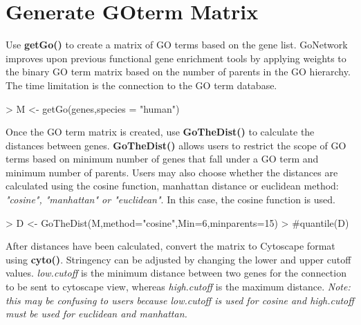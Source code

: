 \documentclass{article}
\begin{document}
\section*{Generate GOterm Matrix}
Use \textbf{getGo()} to create a matrix of GO terms based on the gene list.  GoNetwork improves upon previous functional gene enrichment tools by applying weights to the binary GO term matrix based on the number of parents in the GO hierarchy. The time limitation is the connection to the GO term database.
\begin{Schunk}
\begin{Sinput}
> M <- getGo(genes,species = "human")
\end{Sinput}
\end{Schunk}


Once the GO term matrix is created, use \textbf{GoTheDist()} to calculate the distances between genes. \textbf{GoTheDist()} allows users to restrict the scope of GO terms based on minimum number of genes that fall under a GO term and minimum number of parents. Users may also choose whether the distances are calculated using the cosine function, manhattan distance or euclidean method: \textit{"cosine", "manhattan" or "euclidean"}.  In this case, the cosine function is used.

\vspace{5mm}
\begin{Schunk}
\begin{Sinput}
> D <- GoTheDist(M,method="cosine",Min=6,minparents=15)
> #quantile(D)
\end{Sinput}
\end{Schunk}

After distances have been calculated, convert the matrix to Cytoscape format using \textbf{cyto()}. Stringency can be adjusted by changing the lower and upper cutoff values. \textit{low.cutoff} is the minimum distance between two genes for the connection to be sent to cytoscape view, whereas \textit{high.cutoff} is the maximum distance.  \textit{Note: this may be confusing to users because low.cutoff is used for cosine and high.cutoff must be used for euclidean and manhattan.}
\end{document}
